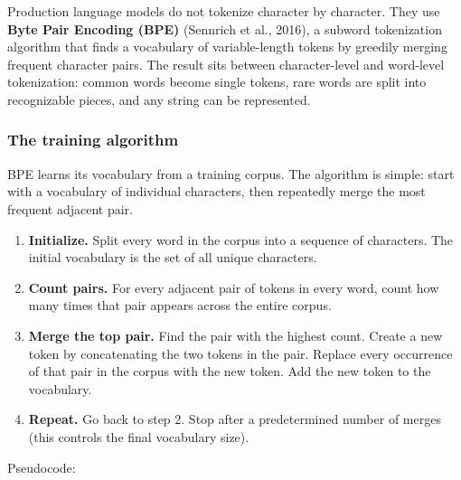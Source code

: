 Production language models do not tokenize character by character. They use \textbf{Byte Pair Encoding (BPE)} (Sennrich et al., 2016), a subword tokenization algorithm that finds a vocabulary of variable-length tokens by greedily merging frequent character pairs. The result sits between character-level and word-level tokenization: common words become single tokens, rare words are split into recognizable pieces, and any string can be represented.

\subsubsection{The training algorithm}

BPE learns its vocabulary from a training corpus. The algorithm is simple: start with a vocabulary of individual characters, then repeatedly merge the most frequent adjacent pair.

\begin{enumerate}
  \item \textbf{Initialize.} Split every word in the corpus into a sequence of characters. The initial vocabulary is the set of all unique characters.
  \item \textbf{Count pairs.} For every adjacent pair of tokens in every word, count how many times that pair appears across the entire corpus.
  \item \textbf{Merge the top pair.} Find the pair with the highest count. Create a new token by concatenating the two tokens in the pair. Replace every occurrence of that pair in the corpus with the new token. Add the new token to the vocabulary.
  \item \textbf{Repeat.} Go back to step 2. Stop after a predetermined number of merges (this controls the final vocabulary size).
\end{enumerate}

Pseudocode:

